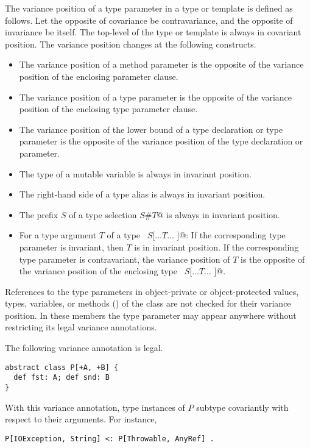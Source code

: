 The variance position of a type parameter in a type or template is
defined as follows.  Let the opposite of covariance be contravariance,
and the opposite of invariance be itself.  The top-level of the type
or template is always in covariant position. The variance position
changes at the following constructs.
\begin{itemize}
\item
The variance position of a method parameter is the opposite of the 
variance position of the enclosing parameter clause.
\item
The variance position of a type parameter is the opposite of the
variance position of the enclosing type parameter clause.
\item
The variance position of the lower bound of a type declaration or type parameter 
is the opposite of the variance position of the type declaration or parameter.  
\item
The type of a mutable variable is always in invariant position.
\item
The right-hand side of a type alias is always in invariant position.
\item 
The prefix $S$ of a type selection \lstinline@$S$#$T$@ is always in invariant position.
\item
For a type argument $T$ of a type ~\lstinline@$S$[$\ldots T \ldots$ ]@: If the
corresponding type parameter is invariant, then $T$ is in
invariant position.  If the corresponding type parameter is
contravariant, the variance position of $T$ is the opposite of
the variance position of the enclosing type ~\lstinline@$S$[$\ldots T \ldots$ ]@.
\end{itemize}
References to the type parameters in object-private or object-protected values, types, variables,
or methods () of the class are not checked for their variance
position. In these members the type parameter may appear anywhere
without restricting its legal variance annotations.

\example The following variance annotation is legal. 
\begin{lstlisting}
abstract class P[+A, +B] {
  def fst: A; def snd: B
}
\end{lstlisting}
With this variance annotation, type instances
of $P$ subtype covariantly with respect to their arguments. 
For instance, 
\begin{lstlisting}
P[IOException, String] <: P[Throwable, AnyRef] .
\end{lstlisting}

